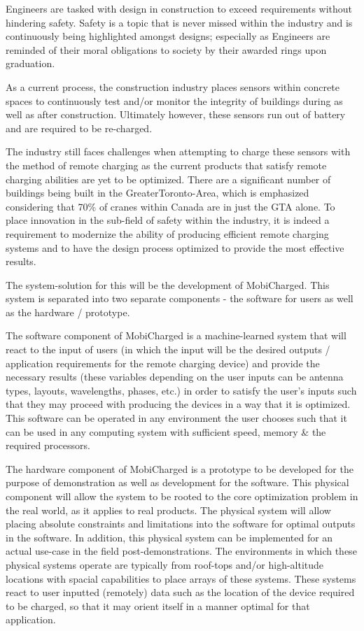 \documentclass[12pt, titlepage]{article}
\begin{document}
Engineers are tasked with design in construction to exceed requirements without hindering safety. Safety is a topic that is never missed within the industry and is continuously being highlighted amongst designs; especially as Engineers are reminded of their moral obligations to society by their awarded rings upon graduation. 
\par
As a current process, the construction industry places sensors within concrete spaces to continuously test and/or monitor the integrity of buildings during as well as after construction. Ultimately however, these sensors run out of battery and are required to be re-charged.
\par
The industry still faces challenges when attempting to charge these sensors with the method of remote charging as the current products that satisfy remote charging abilities are yet to be optimized. There are a significant number of buildings being built in the GreaterToronto-Area, which is emphasized considering that 70\% of cranes within Canada are in just the GTA alone. To place innovation in the sub-field of safety within the industry, it is indeed a requirement to modernize the ability of producing efficient remote charging systems and to have the design process optimized to provide the most effective results.
\par
The system-solution for this will be the development of MobiCharged. This system is separated into two separate components - the software for users as well as the hardware / prototype. 
\par
The software component of MobiCharged is a machine-learned system that will react to the input of users (in which the input will be the desired outputs / application requirements for the remote charging device) and provide the necessary results (these variables depending on the user inputs can be antenna types, layouts, wavelengths, phases, etc.)  in order to satisfy the user’s inputs such that they may proceed with producing the devices in a way that it is optimized. This software can be operated in any environment the user chooses such that it can be used in any computing system with sufficient speed, memory \& the required processors. 
\par
The hardware component of MobiCharged is a prototype to be developed for the purpose of demonstration as well as development for the software. This physical component will allow the system to be rooted to the core optimization problem in the real world, as it applies to real products. The physical system will allow placing absolute constraints and limitations into the software for optimal outputs in the software. In addition, this physical system can be implemented for an actual use-case in the field post-demonstrations. The environments in which these physical systems operate are typically from roof-tops and/or high-altitude locations with spacial capabilities to place arrays of these systems. These systems react to user inputted (remotely) data such as the location of the device required to be charged, so that it may orient itself in a manner optimal for that application. 
\end{document}
